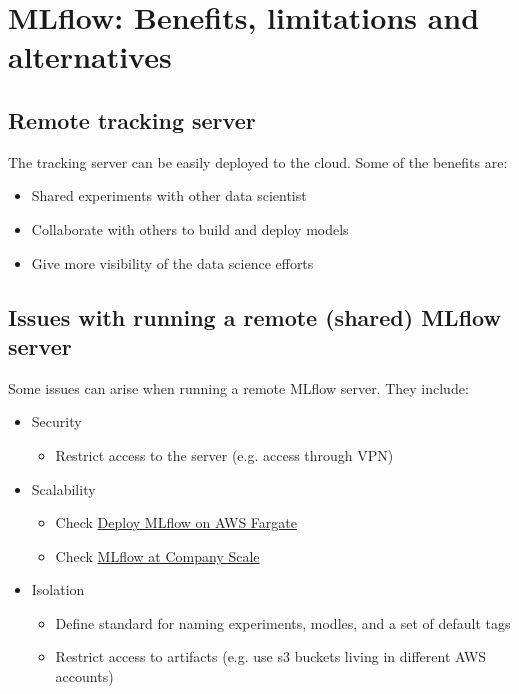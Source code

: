 \documentclass[letterpaper,12pt,notitlepage,twoside]{report}
\begin{document}
\section{MLflow: Benefits, limitations and alternatives}
\subsection{Remote tracking server}
The tracking server can be easily deployed to the cloud. Some of the benefits are:
\begin{itemize}[noitemsep, topsep=0pt]
\item Shared experiments with other data scientist
\item Collaborate with others to build and deploy models
\item Give more visibility of the data science efforts
\end{itemize}

\subsection{Issues with running a remote (shared) MLflow server}
Some issues can arise when running a remote MLflow server. They include:
\begin{itemize}[noitemsep, topsep=0pt]
\item Security
	\begin{itemize}[label={}]
	\item Restrict access to the server (e.g. access through VPN)
	\end{itemize}
\item Scalability
	\begin{itemize}[label={}]
	\item Check \href{https://aws.amazon.com/blogs/machine-learning/managing-your-machine-learning-lifecycle-with-mlflow-and-amazon-sagemaker/}{Deploy MLflow on AWS Fargate}
	\item Check \href{https://www.slideshare.net/databricks/mlflow-at-company-scale-239587085}{MLflow at Company Scale}
	\end{itemize}
\item Isolation
	\begin{itemize}[label={}]
	\item Define standard for naming experiments, modles, and a set of default tags
	\item Restrict access to artifacts (e.g. use s3 buckets living in different AWS accounts)
	\end{itemize}
\end{itemize}
\end{document}
